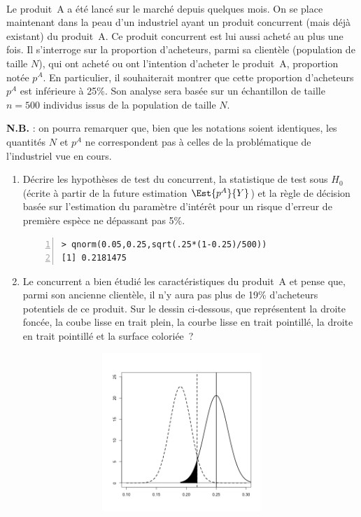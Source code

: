 \documentclass[10pt]{report}
\begin{document}
\begin{exercice}~

Le produit~A a été lancé sur le marché depuis quelques mois. On se place maintenant dans la peau d'un industriel ayant un produit concurrent (mais déjà existant) du produit~A. Ce produit concurrent est lui aussi acheté au plus une fois. Il s'interroge sur la proportion d'acheteurs, parmi sa clientèle (population de taille $N$), qui ont acheté ou ont l'intention d'acheter le produit~A, proportion notée $p^A$. En particulier, il souhaiterait montrer que cette proportion d'acheteurs $p^A$ est inférieure à 25\%. Son analyse sera basée sur un échantillon de taille $n=500$ individus issus de la population de taille $N$. 

\noindent \textbf{N.B.} : on pourra remarquer que, bien que les notations soient identiques, les quantités $N$ et $p^A$ ne correspondent pas à celles de la problématique de l'industriel vue en cours. \\

\begin{enumerate}

\item Décrire les hypothèses de test du concurrent, la statistique de test sous $H_0$ (écrite à partir de la future estimation $\Est{p^A}{Y}$) et la règle de décision basée sur l'estimation du paramètre d'intérêt pour un risque d'erreur de première espèce ne dépassant pas 5\%.

\begin{Verbatim}[frame=leftline,fontfamily=tt,fontshape=n,numbers=left]
> qnorm(0.05,0.25,sqrt(.25*(1-0.25)/500))
[1] 0.2181475
\end{Verbatim}





\item Le concurrent a bien étudié les caractéristiques du produit~A et pense que, parmi son ancienne clientèle, il n'y aura pas plus de 19\% d'acheteurs potentiels de ce produit. Sur le dessin ci-dessous, que représentent la droite foncée, la coube lisse en trait plein, la courbe lisse en trait pointillé, la droite en trait pointillé et la surface coloriée~?



\begin{center}
\includegraphics[width=12cm,height=6cm]{img/secEspConcurent}
\end{center}




\end{enumerate}
\end{exercice}
\end{document}
